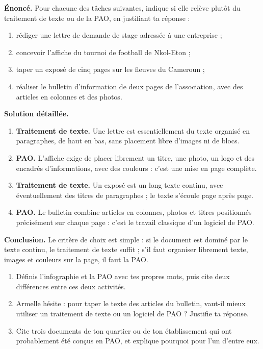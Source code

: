 \documentclass[11pt]{article}
\begin{document}
\begin{exoresolu}
\textbf{Énoncé.} Pour chacune des tâches suivantes, indique si elle relève plutôt du traitement de texte ou de la PAO, en justifiant ta réponse :
\begin{enumerate}
\item rédiger une lettre de demande de stage adressée à une entreprise ;
\item concevoir l'affiche du tournoi de football de Nkol-Eton ;
\item taper un exposé de cinq pages sur les fleuves du Cameroun ;
\item réaliser le bulletin d'information de deux pages de l'association, avec des articles en colonnes et des photos.
\end{enumerate}
\tcblower
\textbf{Solution détaillée.}
\begin{enumerate}
\item \textbf{Traitement de texte.} Une lettre est essentiellement du texte organisé en paragraphes, de haut en bas, sans placement libre d'images ni de blocs.
\item \textbf{PAO.} L'affiche exige de placer librement un titre, une photo, un logo et des encadrés d'informations, avec des couleurs : c'est une mise en page complète.
\item \textbf{Traitement de texte.} Un exposé est un long texte continu, avec éventuellement des titres de paragraphes ; le texte s'écoule page après page.
\item \textbf{PAO.} Le bulletin combine articles en colonnes, photos et titres positionnés précisément sur chaque page : c'est le travail classique d'un logiciel de PAO.
\end{enumerate}
\textbf{Conclusion.} Le critère de choix est simple : si le document est dominé par le texte continu, le traitement de texte suffit ; s'il faut organiser librement texte, images et couleurs sur la page, il faut la PAO.
\end{exoresolu}

\begin{exercice}
\begin{enumerate}
\item Définis l'infographie et la PAO avec tes propres mots, puis cite deux différences entre ces deux activités.
\item Armelle hésite : pour taper le texte des articles du bulletin, vaut-il mieux utiliser un traitement de texte ou un logiciel de PAO ? Justifie ta réponse.
\item Cite trois documents de ton quartier ou de ton établissement qui ont probablement été conçus en PAO, et explique pourquoi pour l'un d'entre eux.
\end{enumerate}
\end{exercice}
\end{document}
